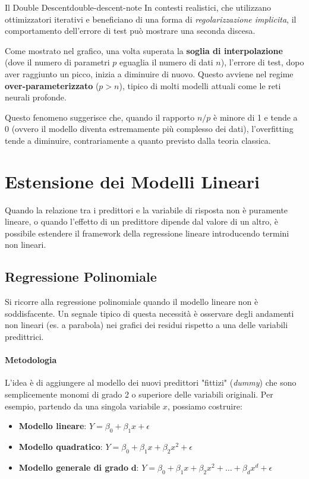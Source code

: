 \begin{nota}{Il Double Descent}{double-descent-note}
In contesti realistici, che utilizzano ottimizzatori iterativi e beneficiano di
una forma di \textit{regolarizzazione implicita}, il comportamento dell'errore
di test può mostrare una seconda discesa.

Come mostrato nel grafico, una volta superata la \textbf{soglia di
interpolazione} (dove il numero di parametri \(p\) eguaglia il numero di dati
\(n\)), l'errore di test, dopo aver raggiunto un picco, inizia a diminuire di
nuovo. Questo avviene nel regime \textbf{over-parameterizzato} (\(p > n\)),
tipico di molti modelli attuali come le reti neurali profonde.

Questo fenomeno suggerisce che, quando il rapporto \(n/p\) è minore di 1 e
tende a 0 (ovvero il modello diventa estremamente più complesso dei dati),
l'overfitting tende a diminuire, contrariamente a quanto previsto dalla teoria
classica.
\end{nota}


\section{Estensione dei Modelli Lineari}
Quando la relazione tra i predittori e la variabile di risposta non è puramente
lineare, o quando l'effetto di un predittore dipende dal valore di un altro, è
possibile estendere il framework della regressione lineare introducendo termini
non lineari.

\subsection{Regressione Polinomiale}
Si ricorre alla regressione polinomiale quando il modello lineare non è
soddisfacente. Un segnale tipico di questa necessità è osservare degli
andamenti non lineari (es. a parabola) nei grafici dei residui rispetto a una
delle variabili predittrici.

\paragraph{Metodologia}
L'idea è di aggiungere al modello dei nuovi predittori "fittizi"
(\textit{dummy}) che sono semplicemente monomi di grado 2 o superiore delle
variabili originali.
Per esempio, partendo da una singola variabile \(x\), possiamo costruire:
\begin{itemize}
    \item \textbf{Modello lineare}: \(Y = \beta_0 + \beta_1 x + \epsilon\)
    \item \textbf{Modello quadratico}: \(Y = \beta_0 + \beta_1 x + \beta_2 x^2 +
    \epsilon\)
    \item \textbf{Modello generale di grado} \(\mathbf{d}\): \(Y = \beta_0 +
    \beta_1 x + \beta_2 x^2 + \dots + \beta_d x^d + \epsilon\)
\end{itemize}


